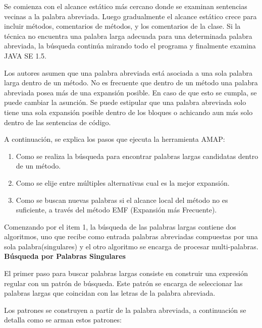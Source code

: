 \documentclass[a4paper,12pt]{report}
\begin{document}
Se comienza con el alcance estático más cercano donde se examinan sentencias vecinas a la palabra abreviada. Luego gradualmente el alcance estático crece para incluir métodos, comentarios de métodos, y los comentarios de la clase. Si la técnica no encuentra una palabra larga adecuada para una determinada palabra abreviada, la búsqueda continúa mirando todo el programa y finalmente examina JAVA SE 1.5. 

Los autores asumen que una palabra abreviada está asociada a una sola palabra larga dentro de un método. No es frecuente que dentro de un método una palabra abreviada posea más de una expansión posible. En caso de que esto se cumpla, se puede cambiar la asunción. Se puede estipular que una palabra abreviada solo tiene una sola expansión posible dentro de los bloques o achicando aun más solo dentro de las sentencias de código.

A continuación, se explica los pasos que ejecuta la herramienta AMAP: 
\begin{enumerate}
\itemsep0em%
\item Como se realiza la búsqueda para encontrar palabras largas candidatas dentro de un método. 
\item Como se elije entre múltiples alternativas cual es la mejor expansión.
\item Como se buscan nuevas palabras si el alcance local del método no es suficiente, a través del método EMF (Expansión más Frecuente). 
\end{enumerate}


Comenzando por el item 1, la búsqueda de las palabras largas contiene dos algoritmos, uno que recibe como entrada palabras abreviadas compuestas por una sola palabra(singulares) y el otro algoritmo se encarga de procesar multi-palabras.\\

\noindent \textbf{Búsqueda por Palabras Singulares\\}

El primer paso para buscar palabras largas consiste en construir una expresión regular con un patrón de búsqueda.  Este patrón se encarga de seleccionar las palabras largas que coincidan con las letras de la palabra abreviada.

Los patrones se construyen a partir de la palabra abreviada, a continuación se detalla como se arman estos patrones: \\
\end{document}
